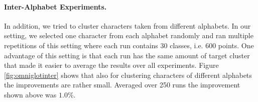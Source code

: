 
\paragraph{Inter-Alphabet Experiments.} In addition, we tried to cluster characters taken from different alphabets. In our setting, we selected one character from each alphabet randomly and ran multiple repetitions of this setting where each run contains 30 classes, i.e. 600 points. One advantage of this setting is that each run has the same amount of target cluster that made it easier to average the results over all experiments. Figure \ref{fig:omniglotinter} shows that also for clustering characters of different alphabets the improvements are rather small. Averaged over 250 runs the improvement shown above was $1.0\%$.

